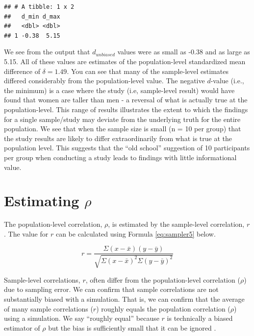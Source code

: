 \documentclass[
]{krantz}
\begin{document}
\begin{verbatim}
## # A tibble: 1 x 2
##   d_min d_max
##   <dbl> <dbl>
## 1 -0.38  5.15
\end{verbatim}

We see from the output that \(d_{unbiased}\) values were as small as -0.38 and as large as 5.15. All of these values are estimates of the population-level standardized mean difference of \(\delta = 1.49\). You can see that many of the sample-level estimates differed considerably from the population-level value. The negative \(d\)-value (i.e., the minimum) is a case where the study (i.e, sample-level result) would have found that women are taller than men - a reversal of what is actually true at the population-level. This range of results illustrates the extent to which the findings for a single sample/study may deviate from the underlying truth for the entire population. We see that when the sample size is small (n = 10 per group) that the study results are likely to differ extraordinarily from what is true at the population level. This suggests that the ``old school'' suggestion of 10 participants per group when conducting a study leads to findings with little informational value.

\hypertarget{estimating-rho}{%
\section{\texorpdfstring{Estimating \(\rho\)}{Estimating \textbackslash rho}}\label{estimating-rho}}

The population-level correlation, \(\rho\), is estimated by the sample-level correlation, \(r\). The value for \(r\) can be calculated using Formula \eqref{eq:sampler5} below.

\begin{equation} 
r =  \frac{\Sigma (x - \bar{x})(y - \bar{y})}{\sqrt{\Sigma (x - \bar{x})^2\Sigma (y - \bar{y})^2}}
      \label{eq:sampler5}
\end{equation}

Sample-level correlations, \(r\), often differ from the population-level correlation (\(\rho\)) due to sampling error. We can confirm that sample correlations are not substantially biased with a simulation. That is, we can confirm that the average of many sample correlations (\(r\)) roughly equals the population correlation (\(\rho\)) using a simulation. We say ``roughly equal'' because \(r\) is technically a biased estimator of \(\rho\) but the bias is sufficiently small that it can be ignored \citep{schmidt2014methods}.
\end{document}
